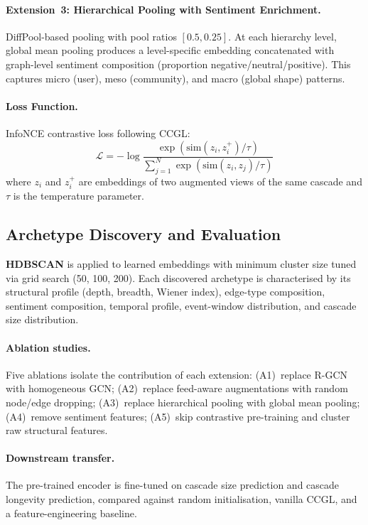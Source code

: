 \documentclass[12pt,a4paper]{article}
\begin{document}
\paragraph{Extension~3: Hierarchical Pooling with Sentiment Enrichment.}
DiffPool-based pooling with pool ratios $[0.5, 0.25]$.  At each hierarchy level,
global mean pooling produces a level-specific embedding concatenated with
graph-level sentiment composition (proportion negative/neutral/positive).  This
captures micro (user), meso (community), and macro (global shape) patterns.

\paragraph{Loss Function.}
InfoNCE contrastive loss following CCGL:
\begin{equation}
\mathcal{L} = -\log \frac{\exp(\mathrm{sim}(z_i, z_i^+) / \tau)}%
              {\sum_{j=1}^{N} \exp(\mathrm{sim}(z_i, z_j) / \tau)}
\end{equation}
where $z_i$ and $z_i^+$ are embeddings of two augmented views of the same
cascade and $\tau$ is the temperature parameter.

\subsection{Archetype Discovery and Evaluation}

\textbf{HDBSCAN} is applied to learned embeddings with minimum cluster size
tuned via grid search (50, 100, 200).  Each discovered archetype is
characterised by its structural profile (depth, breadth, Wiener index),
edge-type composition, sentiment composition, temporal profile, event-window
distribution, and cascade size distribution.

\paragraph{Ablation studies.}
Five ablations isolate the contribution of each extension:
(A1)~replace R-GCN with homogeneous GCN;
(A2)~replace feed-aware augmentations with random node/edge dropping;
(A3)~replace hierarchical pooling with global mean pooling;
(A4)~remove sentiment features;
(A5)~skip contrastive pre-training and cluster raw structural features.

\paragraph{Downstream transfer.}
The pre-trained encoder is fine-tuned on cascade size prediction and cascade
longevity prediction, compared against random initialisation, vanilla CCGL, and
a feature-engineering baseline.
\end{document}
